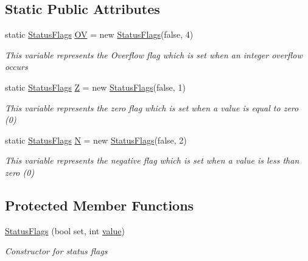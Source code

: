 \subsection*{Static Public Attributes}
\begin{DoxyCompactItemize}
\item 
static \hyperlink{class_c_p_u___o_s___simulator_1_1_c_p_u_1_1_status_flags}{Status\+Flags} \hyperlink{class_c_p_u___o_s___simulator_1_1_c_p_u_1_1_status_flags_ad4725b32f8d1718df7e6a1b6b4a21170}{O\+V} = new \hyperlink{class_c_p_u___o_s___simulator_1_1_c_p_u_1_1_status_flags}{Status\+Flags}(false, 4)
\begin{DoxyCompactList}\small\item\em This variable represents the Overflow flag which is set when an integer overflow occurs \end{DoxyCompactList}\item 
static \hyperlink{class_c_p_u___o_s___simulator_1_1_c_p_u_1_1_status_flags}{Status\+Flags} \hyperlink{class_c_p_u___o_s___simulator_1_1_c_p_u_1_1_status_flags_aa38943c12054a3f613161ecde5580f27}{Z} = new \hyperlink{class_c_p_u___o_s___simulator_1_1_c_p_u_1_1_status_flags}{Status\+Flags}(false, 1)
\begin{DoxyCompactList}\small\item\em This variable represents the zero flag which is set when a value is equal to zero (0) \end{DoxyCompactList}\item 
static \hyperlink{class_c_p_u___o_s___simulator_1_1_c_p_u_1_1_status_flags}{Status\+Flags} \hyperlink{class_c_p_u___o_s___simulator_1_1_c_p_u_1_1_status_flags_a48a766c8a99690112570b884b09e9b10}{N} = new \hyperlink{class_c_p_u___o_s___simulator_1_1_c_p_u_1_1_status_flags}{Status\+Flags}(false, 2)
\begin{DoxyCompactList}\small\item\em This variable represents the negative flag which is set when a value is less than zero (0) \end{DoxyCompactList}\end{DoxyCompactItemize}
\subsection*{Protected Member Functions}
\begin{DoxyCompactItemize}
\item 
\hyperlink{class_c_p_u___o_s___simulator_1_1_c_p_u_1_1_status_flags_ab99e9cd2522d43a7dfd3224ff9ae0d79}{Status\+Flags} (bool set, int \hyperlink{class_c_p_u___o_s___simulator_1_1_c_p_u_1_1_status_flags_a289edb09fa9bef509188db5619be8dee}{value})
\begin{DoxyCompactList}\small\item\em Constructor for status flags \end{DoxyCompactList}\end{DoxyCompactItemize}
